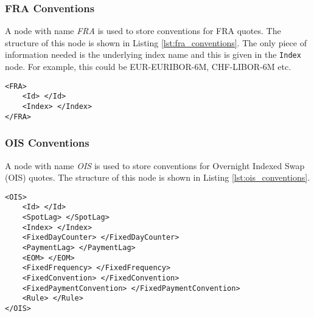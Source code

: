 \subsubsection{FRA Conventions}
A node with name \emph{FRA} is used to store conventions for FRA quotes. The structure of this node is shown in Listing 
\ref{lst:fra_conventions}. The only piece of information needed is the underlying index name and this is given in the 
\lstinline!Index! node. For example, this could be EUR-EURIBOR-6M, CHF-LIBOR-6M etc.

{\footnotesize
\begin{lstlisting}[caption={FRA conventions}, label=lst:fra_conventions]
<FRA>
	<Id> </Id>
	<Index> </Index>
</FRA>
\end{lstlisting}
}

\subsubsection{OIS Conventions}

A node with name \emph{OIS} is used to store conventions for Overnight Indexed Swap (OIS) quotes. The structure of this 
node is shown in Listing \ref{lst:ois_conventions}.

{\footnotesize
\begin{lstlisting}[caption={OIS conventions}, label=lst:ois_conventions]
<OIS>
	<Id> </Id>
	<SpotLag> </SpotLag>
	<Index> </Index>
	<FixedDayCounter> </FixedDayCounter>
	<PaymentLag> </PaymentLag>
	<EOM> </EOM>
	<FixedFrequency> </FixedFrequency>
	<FixedConvention> </FixedConvention>
	<FixedPaymentConvention> </FixedPaymentConvention>
	<Rule> </Rule>
</OIS>
\end{lstlisting}
}

